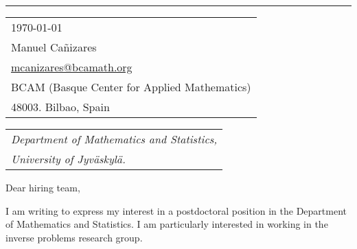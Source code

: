 \documentclass{article}
\begin{document}


\vspace{-1em} %

\rule{\linewidth}{1pt} %



\hfill
\begin{tabular}{l @{}}
\hfill \today \bigskip\\ %
\hfill Manuel Ca\~{n}izares \\
\hfill \href{mailto:mcanizares@bcamath.org}{mcanizares@bcamath.org}\\
\hfill BCAM (Basque Center for Applied Mathematics)\\
\hfill 48003. Bilbao, Spain \\ %
\end{tabular}

\bigskip %


\begin{tabular}{@{} l}\\
		\textit{Department of Mathematics and Statistics,}\\\textit{University of Jyv\"askyl\"a.}
\end{tabular}

\bigskip %

Dear hiring team,

\bigskip %


I am writing to express my interest in a postdoctoral position in the Department of Mathematics and Statistics. I am particularly interested in working in the inverse problems research group.
\end{document}
